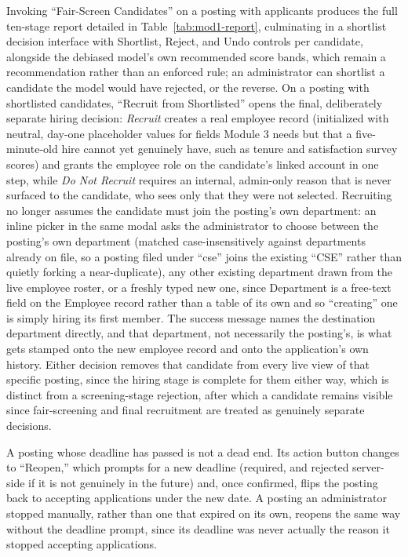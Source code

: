 \documentclass[11pt,a4paper]{article}
\begin{document}
Invoking ``Fair-Screen Candidates'' on a posting with applicants produces the full ten-stage report detailed in Table~\ref{tab:mod1-report}, culminating in a shortlist decision interface with Shortlist, Reject, and Undo controls per candidate, alongside the debiased model's own recommended score bands, which remain a recommendation rather than an enforced rule; an administrator can shortlist a candidate the model would have rejected, or the reverse. On a posting with shortlisted candidates, ``Recruit from Shortlisted'' opens the final, deliberately separate hiring decision: \emph{Recruit} creates a real employee record (initialized with neutral, day-one placeholder values for fields Module 3 needs but that a five-minute-old hire cannot yet genuinely have, such as tenure and satisfaction survey scores) and grants the employee role on the candidate's linked account in one step, while \emph{Do Not Recruit} requires an internal, admin-only reason that is never surfaced to the candidate, who sees only that they were not selected. Recruiting no longer assumes the candidate must join the posting's own department: an inline picker in the same modal asks the administrator to choose between the posting's own department (matched case-insensitively against departments already on file, so a posting filed under ``cse'' joins the existing ``CSE'' rather than quietly forking a near-duplicate), any other existing department drawn from the live employee roster, or a freshly typed new one, since Department is a free-text field on the Employee record rather than a table of its own and so ``creating'' one is simply hiring its first member. The success message names the destination department directly, and that department, not necessarily the posting's, is what gets stamped onto the new employee record and onto the application's own history. Either decision removes that candidate from every live view of that specific posting, since the hiring stage is complete for them either way, which is distinct from a screening-stage rejection, after which a candidate remains visible since fair-screening and final recruitment are treated as genuinely separate decisions.

A posting whose deadline has passed is not a dead end. Its action button changes to ``Reopen,'' which prompts for a new deadline (required, and rejected server-side if it is not genuinely in the future) and, once confirmed, flips the posting back to accepting applications under the new date. A posting an administrator stopped manually, rather than one that expired on its own, reopens the same way without the deadline prompt, since its deadline was never actually the reason it stopped accepting applications.
\end{document}
